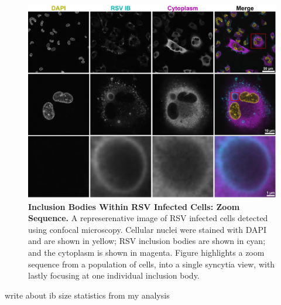 \begin{figure}
    \centering
    \includegraphics[width=1\linewidth]{08. Chapter 3/Figs/01. Localisation introduction/01. IB-zooms.pdf}
    \caption[Inclusion Bodies Within RSV Infected Cells: Zoom Sequence.]{\textbf{Inclusion Bodies Within RSV Infected Cells: Zoom Sequence.} A represerenative image of RSV infected cells detected using confocal microscopy. Cellular nuclei were stained with DAPI and are shown in yellow; RSV inclusion bodies are shown in cyan; and the cytoplasm is shown in magenta. Figure highlights a zoom sequence from a population of cells, into a single syncytia view, with lastly focusing at one individual inclusion body.}
    \label{fig:Inclusion Bodies Within RSV Infected Cells: Zoom Sequence}
\end{figure}

write about ib size statistics from my analysis

